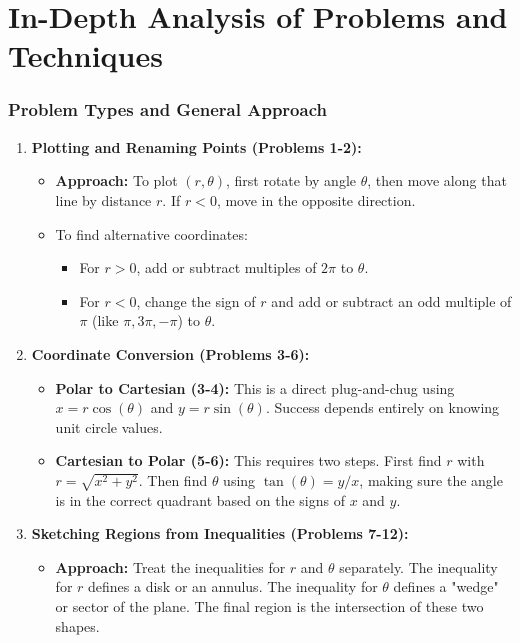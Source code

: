 \documentclass{article}
\begin{document}
\part{In-Depth Analysis of Problems and Techniques}

\section{Problem Types and General Approach}

\begin{enumerate}
    \item \textbf{Plotting and Renaming Points (Problems 1-2):}
    \begin{itemize}
        \item \textbf{Approach:} To plot \((r, \theta)\), first rotate by angle \(\theta\), then move along that line by distance \(r\). If \(r < 0\), move in the opposite direction.
        \item To find alternative coordinates:
        \begin{itemize}
            \item For \(r > 0\), add or subtract multiples of \(2\pi\) to \(\theta\).
            \item For \(r < 0\), change the sign of \(r\) and add or subtract an odd multiple of \(\pi\) (like \(\pi, 3\pi, -\pi\)) to \(\theta\).
        \end{itemize}
    \end{itemize}

    \item \textbf{Coordinate Conversion (Problems 3-6):}
    \begin{itemize}
        \item \textbf{Polar to Cartesian (3-4):} This is a direct plug-and-chug using \(x = r \cos(\theta)\) and \(y = r \sin(\theta)\). Success depends entirely on knowing unit circle values.
        \item \textbf{Cartesian to Polar (5-6):} This requires two steps. First find \(r\) with \(r = \sqrt{x^2 + y^2}\). Then find \(\theta\) using \(\tan(\theta) = y/x\), making sure the angle is in the correct quadrant based on the signs of \(x\) and \(y\).
    \end{itemize}

    \item \textbf{Sketching Regions from Inequalities (Problems 7-12):}
    \begin{itemize}
        \item \textbf{Approach:} Treat the inequalities for \(r\) and \(\theta\) separately. The inequality for \(r\) defines a disk or an annulus. The inequality for \(\theta\) defines a "wedge" or sector of the plane. The final region is the intersection of these two shapes.
    \end{itemize}


\end{enumerate}
\end{document}
